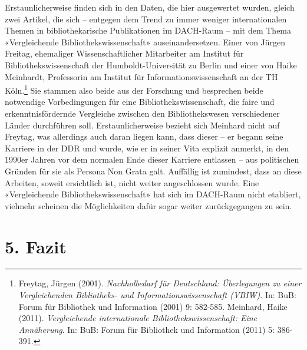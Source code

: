 \documentclass[a4paper,
fontsize=11pt,
oneside,
numbers=noperiodatend,
parskip=half-,
bibliography=totoc,
final
]{scrartcl}
\begin{document}
Erstaunlicherweise finden sich in den Daten, die hier ausgewertet
wurden, gleich zwei Artikel, die sich -- entgegen dem Trend zu immer
weniger internationalen Themen in bibliothekarische Publikationen im
DACH-Raum -- mit dem Thema «Vergleichende Bibliothekswissenschaft»
auseinandersetzen. Einer von Jürgen Freitag, ehemaliger
Wissenschaftlicher Mitarbeiter am Institut für Bibliothekswissenschaft
der Humboldt-Universität zu Berlin und einer von Haike Meinhardt,
Professorin am Institut für Informationswissenschaft an der TH
Köln.\footnote{Freytag, Jürgen (2001). \emph{Nachholbedarf für
  Deutschland: Überlegungen zu einer Vergleichenden Bibliotheks- und
  Informationswissenschaft (VBIW)}. In: BuB: Forum für Bibliothek und
  Information (2001) 9: 582-585. Meinhard, Haike (2011).
  \emph{Vergleichende internationale Bibliothekswissenschaft: Eine
  Annäherung}. In: BuB: Forum für Bibliothek und Information (2011) 5:
  386-391.} Sie stammen also beide aus der Forschung und besprechen
beide notwendige Vorbedingungen für eine Bibliothekswissenschaft, die
faire und erkenntnisfördernde Vergleiche zwischen den Bibliothekswesen
verschiedener Länder durchführen soll. Erstaunlicherweise bezieht sich
Meinhard nicht auf Freytag, was allerdings auch daran liegen kann, dass
dieser -- er begann seine Karriere in der DDR und wurde, wie er in
seiner Vita explizit anmerkt, in den 1990er Jahren vor dem normalen Ende
dieser Karriere entlassen -- aus politischen Gründen für sie als Persona
Non Grata galt. Auffällig ist zumindest, dass an diese Arbeiten, soweit
ersichtlich ist, nicht weiter angeschlossen wurde. Eine «Vergleichende
Bibliothekswissenschaft» hat sich im DACH-Raum nicht etabliert, vielmehr
scheinen die Möglichkeiten dafür sogar weiter zurückgegangen zu sein.

\hypertarget{fazit}{%
\section{5. Fazit}\label{fazit}}
\end{document}
